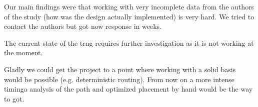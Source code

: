 Our main findings were that working with very incomplete data from the authors of the
study (how was the design actually implemented) is very hard. We tried to contact the
authors but got now response in weeks.


The current state of the \gls{trng} requires further investigation as it is not working at
the moment. 

Gladly we could get the project to a point where working with a solid basis would be
possible (e.g. deterministic routing). 
From now on a more intense timinga analysis of the path and optimized placement by hand
would be the way to got. 
